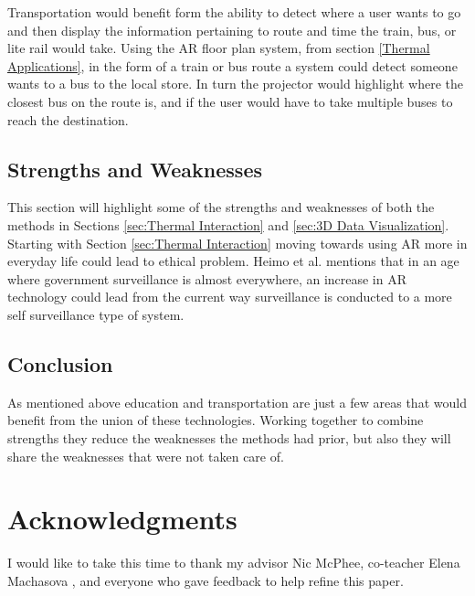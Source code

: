 \documentclass{sig-alternate}
\begin{document}
Transportation would benefit form the ability to detect where a user wants to go and then display the information pertaining to route and time the train, bus, or lite rail would take. Using the AR floor plan system, from section \ref{Thermal Applications}, in the form of a train or bus route a system could detect someone wants to a bus to the local store. In turn the projector would highlight where the closest bus on the route is, and if the user would have to take multiple buses to reach the destination. 


\subsection{Strengths and Weaknesses}
\label{Strengths and Weaknesses}
This section will highlight some of the strengths and weaknesses of both the methods in Sections \ref{sec:Thermal Interaction} and \ref{sec:3D Data Visualization}. Starting with Section \ref{sec:Thermal Interaction} moving towards using AR more in everyday life could lead to ethical problem. Heimo et al. \cite{ethics} mentions that in an age where government surveillance is almost everywhere, an increase in AR technology could lead from the current way surveillance is conducted to a more self surveillance type of system.        


\subsection{Conclusion}
\label{Conclusion} 
As mentioned above education and transportation are just a few areas that would benefit from the union of these technologies. Working together to combine strengths they reduce the weaknesses the methods had prior, but also they will share the weaknesses that were not taken care of.  


\section{Acknowledgments}
\label{sec:Acknowledgments}
I would like to take this time to thank my advisor Nic McPhee, co-teacher Elena Machasova    , and everyone who gave feedback to help refine this paper. 


\end{document}
